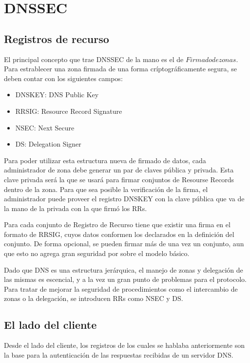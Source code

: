 \chapter{DNSSEC}

\section{Registros de recurso}

El principal concepto que trae DNSSEC de la mano es el de $Firmado de zonas$. Para estrablecer una zona firmada de una forma críptográficamente segura, se deben contar con los siguientes campos:

\begin{itemize}
  \item DNSKEY: DNS Public Key
  \item RRSIG: Resource Record Signature
  \item NSEC: Next Secure
  \item DS: Delegation Signer
\end{itemize}

Para poder utilizar esta estructura nueva de firmado de datos, cada administrador de zona debe generar un par de claves p\'ublica y privada. Esta clave privada ser\'a la que se usar\'a para firmar conjuntos de Resourse Records dentro de la zona. Para que sea posible la verificaci\'on de la firma, el administrador puede proveer el registro DNSKEY con la clave p\'ublica que va de la mano de la privada con la que firm\'o los RRs.

Para cada conjunto de Registro de Recurso tiene que existir una firma en el formato de RRSIG, cuyos datos conformen los declarados en la definici\'on del conjunto. De forma opcional, se pueden firmar m\'as de una vez un conjunto, aun que esto no agrega gran seguridad por sobre el modelo b\'asico.

Dado que DNS es una estructura jer\'arquica, el manejo de zonas y delegaci\'on de las mismas es escencial, y a la vez un gran punto de problemas para el protocolo. Para tratar de mejorar la seguridad de procedimientos como el intercambio de zonas o la delegaci\'on, se introducen RRs como NSEC y DS.

\section{El lado del cliente}

Desde el lado del cliente, los registros de los cuales se hablaba anteriormente son la base para la autenticaci\'on de las respuestas recibidas de un servidor DNS.

